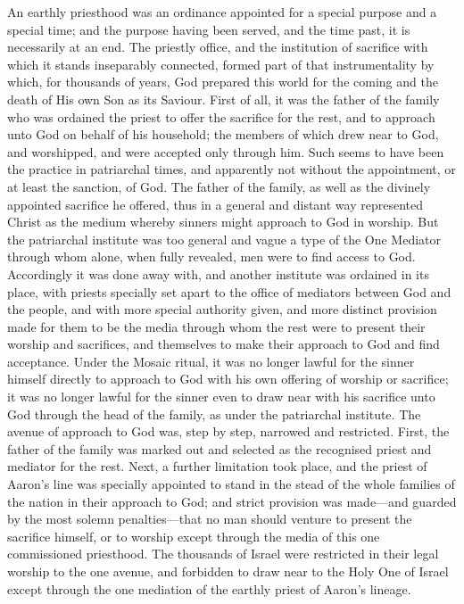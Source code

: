 \documentclass[english,]{book}
\begin{document}
An earthly priesthood was an ordinance appointed for a special purpose and a special time; and the purpose having been served, and the time past, it is necessarily at an end. The priestly office, and the institution of sacrifice with which it stands inseparably connected, formed part of that instrumentality by which, for thousands of years, God prepared this world for the coming and the death of His own Son as its Saviour. First of all, it was the father of the family who was ordained the priest to offer the sacrifice for the rest, and to approach unto God on behalf of his household; the members of which drew near to God, and worshipped, and were accepted only through him. Such seems to have been the practice in patriarchal times, and apparently not without the appointment, or at least the sanction, of God. The father of the family, as well as the divinely appointed sacrifice he offered, thus in a general and distant way represented Christ as the medium whereby sinners might approach to God in worship. But the patriarchal institute was too general and vague a type of the One Mediator through whom alone, when fully revealed, men were to find access to God. Accordingly it was done away with, and another institute was ordained in its place, with priests specially set apart to the office of mediators between God and the people, and with more special authority given, and more distinct provision made for them to be the media through whom the rest were to present their worship and sacrifices, and themselves to make their approach to God and find acceptance. Under the Mosaic ritual, it was no longer lawful for the sinner himself directly to approach to God with his own offering of worship or sacrifice; it was no longer lawful for the sinner even to draw near with his sacrifice unto God through the head of the family, as under the patriarchal institute. The avenue of approach to God was, step by step, narrowed and restricted. First, the father of the family was marked out and selected as the recognised priest and mediator for the rest. Next, a further limitation took place, and the priest of Aaron's line was specially appointed to stand in the stead of the whole families of the nation in their approach to God; and strict provision was made---and guarded by the most solemn penalties---that no man should venture to present the sacrifice himself, or to worship except through the media of this one commissioned priesthood. The thousands of Israel were restricted in their legal worship to the one avenue, and forbidden to draw near to the Holy One of Israel except through the one mediation of the earthly priest of Aaron's lineage.
\end{document}
